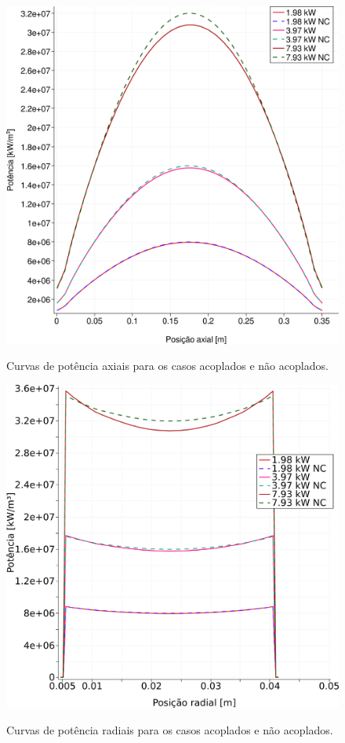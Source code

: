 \begin{figure}[htb]
  \caption{Curvas de potência axiais para os casos acoplados e não acoplados.}
  \centering\includegraphics[scale=0.5]{figuras/Q_all_z_square_port.png}
  \label{fig:Q_all_z}
\end{figure}

\begin{figure}[htb]
  \caption{Curvas de potência radiais para os casos acoplados e não acoplados.}
  \centering\includegraphics[scale=0.5]{figuras/Q_all_x_square_port.png}
  \label{fig:Q_all_x}
\end{figure}

